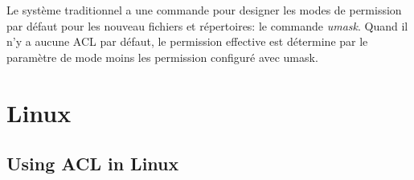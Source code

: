 Le système traditionnel a une commande pour designer les modes de permission par défaut pour les nouveau fichiers et répertoires: le commande \emph{umask}. Quand il n'y a aucune ACL par défaut, le permission effective est détermine par le paramètre de mode moins les permission configuré avec umask. 



% 
% 



\section{Linux}









\subsection*{Using ACL in Linux}
 

